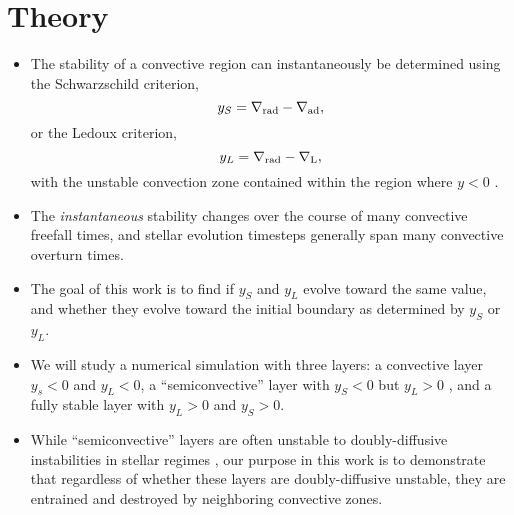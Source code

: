 \section{Theory}
\label{sec:theory}

\begin{itemize}
\item The stability of a convective region can instantaneously be determined using the Schwarzschild criterion,
\begin{equation}
    y_S = \gradrad - \gradad,
\end{equation}
or the Ledoux criterion,
\begin{equation}
y_L = \gradrad - \gradL,
\end{equation}
with the unstable convection zone contained within the region where $y < 0$ \citep[see e.g., section 2 of][]{mesa4}.
\item The \emph{instantaneous} stability changes over the course of many convective freefall times, and stellar evolution timesteps generally span many convective overturn times.
\item The goal of this work is to find if $y_S$ and $y_L$ evolve toward the same value, and whether they evolve toward the initial boundary as determined by $y_S$ or $y_L$.
\item We will study a numerical simulation with three layers: a convective layer $y_s < 0$ and $y_L < 0$, a ``semiconvective'' \citep[see section 4 of][]{mesa2} \citep{salaris_cassisi_2017} layer with $y_S < 0$ but $y_L > 0$ \citep[which is stable to ODDC][]{garaud_2018}, and a fully stable layer with $y_L > 0$ and $y_S > 0$.
\item While ``semiconvective'' layers are often unstable to doubly-diffusive instabilities in stellar regimes \citep{moore_garaud_2016}, our purpose in this work is to demonstrate that regardless of whether these layers are doubly-diffusive unstable, they are entrained and destroyed by neighboring convective zones.
\end{itemize}


